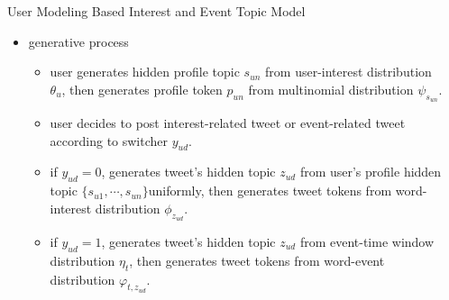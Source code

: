 \documentclass{beamer}
\begin{document}
\begin{frame}
\begin{columns}[T]
\begin{column}{.46\textwidth}
{\begin{block}{User Modeling Based Interest and Event Topic Model}
\begin{itemize}
\end{itemize}
                \begin{itemize}
                        \item generative process
                        \begin{itemize}
                                \item \footnotesize{user generates hidden profile topic \(s_{un}\) from user-interest distribution \(\theta_u\), then generates profile token \(p_{un}\) from multinomial distribution \(\psi_{s_{un}}\).}
                                \item \footnotesize{user decides to post interest-related tweet or event-related tweet according to switcher \(y_{ud}\).}
                                \item \footnotesize{if \(y_{ud}=0\), generates tweet's hidden topic \(z_{ud}\) from user's profile hidden topic \(\{s_{u1},\cdots,s_{un}\} \)uniformly, then generates tweet tokens from word-interest distribution \(\phi_{z_{ud}}\).}
                                \item \footnotesize{if \(y_{ud}=1\), generates tweet's hidden topic \(z_{ud}\) from event-time window distribution \(\eta_t\), then generates tweet tokens from word-event distribution \(\varphi_{t,z_{ud}}\).}
                        \end{itemize}
                \end{itemize}

\end{block}

}
\end{column}

\begin{column}{.46\textwidth}
\parbox[t][1200mm]{\textwidth}{

}
\end{column}
\end{columns}
\end{frame}
\end{document}
